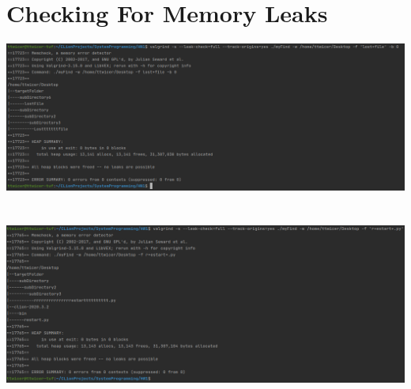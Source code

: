 \documentclass{article}
\begin{document}
\section*{Checking For Memory Leaks}
\includegraphics[scale=0.345]{adsız2.png}
\section*{}
\includegraphics[scale=0.354]{adsız3.png}
\end{document}
